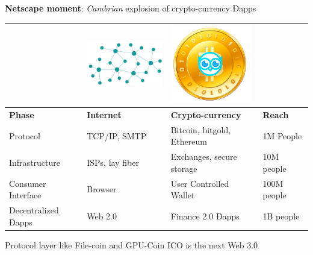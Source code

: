 \textbf{Netscape moment}: \emph{Cambrian} explosion of crypto-currency Ðapps
 

 \begin{adjustbox}{width=1\textwidth}
\begin{tabularx} {\textwidth}{|X|X|X|X|}
    \hline
&    \includegraphics[scale=0.3]{static/decentnew} &     \includegraphics[scale=0.3]{static/hootcoin} & \\
    \hline
\textbf{Phase} & \textbf{Internet} & \textbf{Crypto-currency} & \textbf{Reach}\\
\hline
Protocol & TCP/IP, SMTP & Bitcoin, bitgold, Ethereum & 1M People \\
\hline
Infrastructure & ISPs, lay fiber & Exchanges, secure storage & 10M people \\
\hline
Consumer Interface & Browser & User Controlled Wallet & 100M people \\
\hline
Decentralized Ðapps &  Web 2.0  & Finance 2.0 Ðapps & 1B people\\
\hline
\end{tabularx}
\end{adjustbox}

Protocol layer like File-coin and GPU-Coin ICO is the next Web 3.0